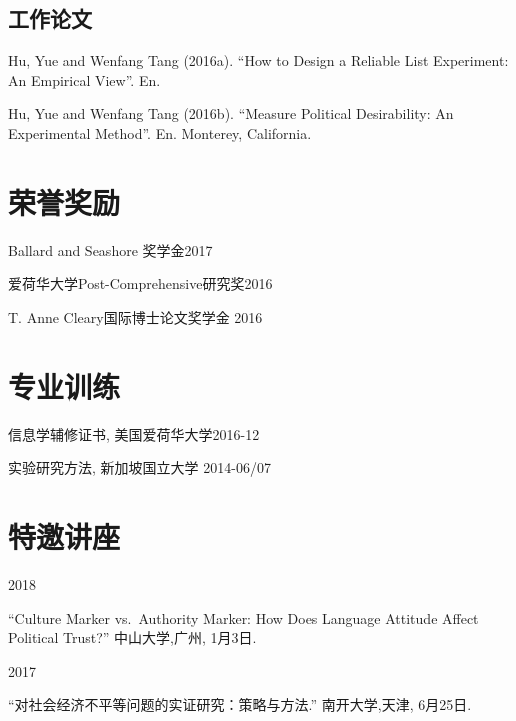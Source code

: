 \documentclass[10.5pt,]{article}
\providecommand{\tightlist}{%
	\setlength{\itemsep}{0pt}\setlength{\parskip}{0pt}}
\renewenvironment{itemize}{
	\begin{list}{}{
			\setlength{\leftmargin}{1.5em}
		}
	}{
	\end{list}
}
\begin{document}
\hypertarget{ux5de5ux4f5cux8bbaux6587}{%
\subsection{工作论文}\label{ux5de5ux4f5cux8bbaux6587}}

Hu, Yue and Wenfang Tang (2016a). ``How to Design a Reliable List
Experiment: An Empirical View''. En.

Hu, Yue and Wenfang Tang (2016b). ``Measure Political Desirability: An
Experimental Method''. En. Monterey, California.

\hypertarget{ux8363ux8a89ux5956ux52b1}{%
\section{荣誉奖励}\label{ux8363ux8a89ux5956ux52b1}}

\begin{itemize}
\tightlist
\item
  Ballard and Seashore 奖学金\hfill 2017
\item
  爱荷华大学Post-Comprehensive研究奖\hfill 2016
\item
  T. Anne Cleary国际博士论文奖学金 \hfill 2016
\end{itemize}

\hypertarget{ux4e13ux4e1aux8badux7ec3}{%
\section{专业训练}\label{ux4e13ux4e1aux8badux7ec3}}

\begin{itemize}
\tightlist
\item
  信息学辅修证书, 美国爱荷华大学\hfill 2016-12
\item
  实验研究方法, 新加坡国立大学 \hfill 2014-06/07
\end{itemize}

\hypertarget{ux7279ux9080ux8bb2ux5ea7}{%
\section{特邀讲座}\label{ux7279ux9080ux8bb2ux5ea7}}

\begin{itemize}
\tightlist
\item
  2018

  \begin{itemize}
  \tightlist
  \item
    ``Culture Marker vs.~Authority Marker: How Does Language Attitude
    Affect Political Trust?'' 中山大学,广州, 1月3日.
  \end{itemize}
\item
  2017

  \begin{itemize}
  \tightlist
  \item
    ``对社会经济不平等问题的实证研究：策略与方法.'' 南开大学,天津,
    6月25日.
  \end{itemize}
\end{itemize}
\end{document}
